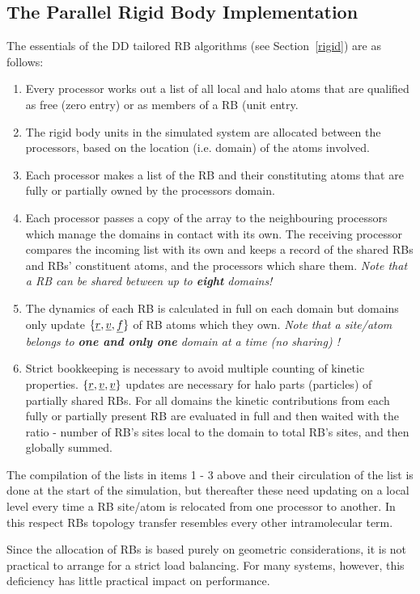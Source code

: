 \subsection{The Parallel Rigid Body Implementation}

The essentials of the DD tailored RB algorithms (see Section~\ref{rigid})
are as follows:
\begin{enumerate}
\item Every processor works out a list of all local and halo atoms
that are qualified as free (zero entry) or as members of a RB
(unit entry.
\item The rigid body units in the simulated system are allocated
between the processors, based on the location (i.e. domain) of
the atoms involved.
\item Each processor makes a list of the RB and their constituting
atoms that are fully or partially owned by the processors domain.
\item Each processor passes a copy of the array to the neighbouring
processors which manage the domains in contact with its own.
The receiving processor compares the incoming list with its own and
keeps a record of the shared RBs and RBs' constituent atoms, and
the processors which share them. {\em Note that a RB can be shared
between up to {\bf eight} domains!}
\item The dynamics of each RB is calculated in full on each domain
but domains only update $\{\mbox{$\underline{r}$},\mbox{$\underline{v}$},\mbox{$\underline{f}$}\}$ of RB atoms which
they own.  {\em Note that a site/atom belongs to {\bf one and
only one} domain at a time (no sharing) !}
\item Strict bookkeeping is necessary to avoid multiple counting of
kinetic properties.  $\{\mbox{$\underline{r}$},\mbox{$\underline{v}$},\mbox{$\underline{v}$}\}$ updates are
necessary for halo parts (particles) of partially shared RBs.  For
all domains the kinetic contributions from each fully or partially
present RB are evaluated in full and then waited with the ratio -
number of RB's sites local to the domain to total RB's sites, and
then globally summed.
\end{enumerate}

The compilation of the lists in items 1 - 3 above and their
circulation of the list is done at the start of the simulation,
but thereafter these need updating on a local level every time
a RB site/atom is relocated from one processor to another.  In this
respect RBs topology transfer resembles every other intramolecular term.

Since the allocation of RBs is based purely on geometric
considerations, it is not practical to arrange for a strict load
balancing.  For many systems, however, this deficiency has little
practical impact on performance.
